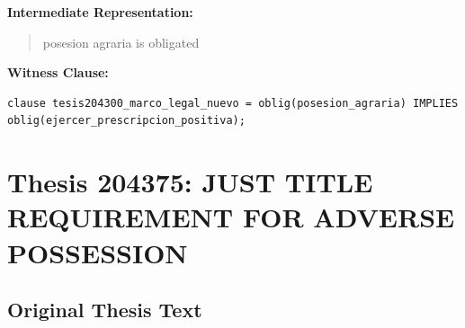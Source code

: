 \documentclass[11pt,a4paper]{article}
\begin{document}
\textbf{Intermediate Representation:}

\begin{quote}
posesion agraria is obligated
\end{quote}

\textbf{Witness Clause:}

\begin{lstlisting}[style=witnessstyle, language=Witness]
clause tesis204300_marco_legal_nuevo = oblig(posesion_agraria) IMPLIES oblig(ejercer_prescripcion_positiva);
\end{lstlisting}

\newpage

\section{Thesis 204375: JUST TITLE REQUIREMENT FOR ADVERSE POSSESSION}
\label{thesis:204375}

\subsection{Original Thesis Text}
\end{document}
